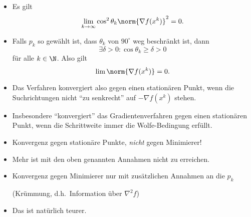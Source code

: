 \begin{itemize}
 \item Es gilt
  \begin{equation*}
   \lim_{k \to \infty} \cos^2 \theta_k \norm{\nabla f(x^k)}^2 =0.
  \end{equation*}
 \item Falls $p_k$ so gewählt ist, dass $\theta_k$ von $90^{\circ}$ weg beschränkt ist, dann
  \begin{equation*}
   \exists \delta >0 \colon \cos \theta_k \geq \delta > 0
  \end{equation*}
  für alle $k \in \N$.  Also gilt
  \begin{equation*}
   \lim \norm{\nabla f(x^k)} = 0.
  \end{equation*}

 \item Das Verfahren konvergiert also gegen einen stationären Punkt, wenn die Suchrichtungen nicht "`zu senkrecht"' auf $-\nabla f (x^k )$  stehen.

 \item Insbesondere "`konvergiert"' das Gradientenverfahren gegen einen stationären Punkt, wenn die Schrittweite immer die Wolfe-Bedingung erfüllt.

 \item Konvergenz gegen stationäre Punkte, \emph{nicht} gegen Minimierer!

 \item Mehr ist mit den oben genannten Annahmen nicht zu erreichen.

 \item Konvergenz gegen Minimierer nur mit zusätzlichen Annahmen an die $p_k$

  (Krümmung, d.h.\ Information über $\nabla^2 f$)

 \item Das ist natürlich teurer.
\end{itemize}

